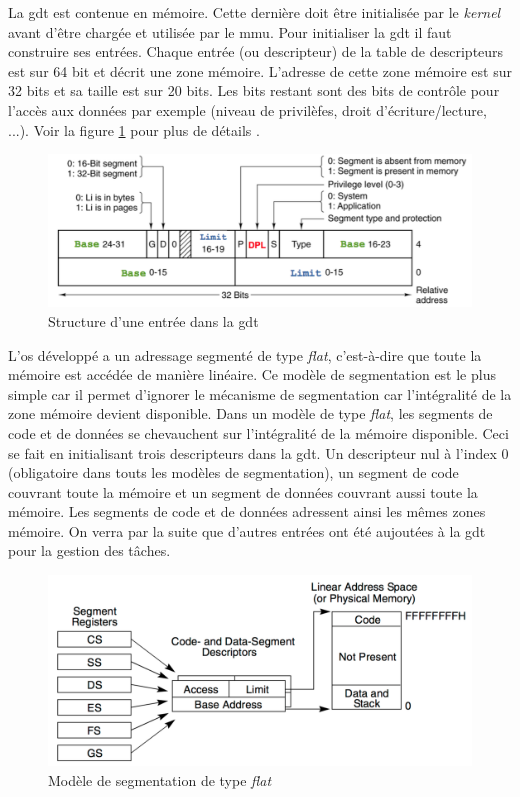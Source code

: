 La \acrshort{gdt} est contenue en mémoire. Cette dernière doit être initialisée
par le \textit{kernel} avant d'être chargée et utilisée par le \acrshort{mmu}.
Pour initialiser la \acrshort{gdt} il faut construire ses entrées. Chaque entrée
(ou descripteur) de la table de descripteurs est sur 64 bit et décrit une zone
mémoire. L'adresse de cette zone mémoire est sur 32 bits et sa taille est sur 20
bits. Les bits restant sont des bits de contrôle pour l'accès aux données par
exemple (niveau de privilèfes, droit d'écriture/lecture, ...). Voir la figure
\ref{gdt_entry} pour plus de détails \cite{ref42,ref14}. \\

\begin{figure}[!h]
  \centering
  \includegraphics[scale=0.75]{images/gdt_entry.png}
  \caption{Structure d'une entrée dans la \acrshort{gdt}}
  \label{gdt_entry}
\end{figure}

L'\acrshort{os} développé a un adressage segmenté de type \textit{flat}, c'est-à-dire
que toute la mémoire est accédée de manière linéaire. Ce modèle de segmentation
est le plus simple car il permet d'ignorer le mécanisme de segmentation car
l'intégralité de la zone mémoire devient disponible. Dans un modèle de type \textit{flat},
les segments de code et de données se chevauchent sur l'intégralité de la mémoire
disponible. Ceci se fait en initialisant trois descripteurs dans la \acrshort{gdt}.
Un descripteur nul à l'index 0 (obligatoire dans touts les modèles de segmentation),
un segment de code couvrant toute la mémoire et un segment de données couvrant
aussi toute la mémoire. Les segments de code et de données adressent ainsi les mêmes
zones mémoire. On verra par la suite que d'autres entrées ont été aujoutées à la
\acrshort{gdt} pour la gestion des tâches. \\

\begin{figure}[!h]
  \centering
  \includegraphics[scale=0.6]{images/flat.png}
  \caption{Modèle de segmentation de type \textit{flat}}
  \label{flat}
\end{figure}

